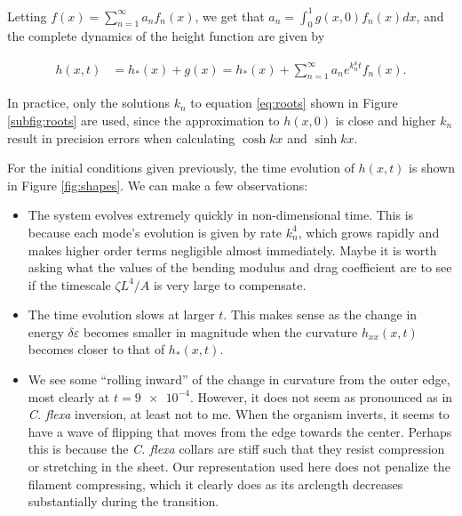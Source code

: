 \documentclass[draft]{article}
\begin{document}
Letting $f(x) = \sum_{n=1}^\infty a_n f_n(x)$, we get that $a_n = \int_0^1 g(x, 0) f_n(x)dx$, and the complete dynamics of the height function are given by 

\begin{align}
    h(x, t) &= h_*(x) + g(x) = h_*(x) + \sum_{n=1}^\infty a_n e^{k_n^4 t} f_n(x). \label{eq:sol}
\end{align}

\noindent In practice, only the solutions $k_n$ to equation \ref{eq:roots} shown in Figure \ref{subfig:roots} are used, since the approximation to $h(x, 0)$ is close and higher $k_n$ result in precision errors when calculating $\cosh kx$ and $\sinh kx$. 

For the initial conditions given previously, the time evolution of $h(x, t)$ is shown in Figure \ref{fig:shapes}. We can make a few observations:

\begin{itemize}
    \item The system evolves extremely quickly in non-dimensional time. This is because each mode's evolution is given by rate $k_n^4$, which grows rapidly and makes higher order terms negligible almost immediately. Maybe it is worth asking what the values of the bending modulus and drag coefficient are to see if the timescale $\zeta L^4 / A$ is very large to compensate.
    \item The time evolution slows at larger $t$. This makes sense as the change in energy $\delta \varepsilon$ becomes smaller in magnitude when the curvature $h_{xx}(x, t)$ becomes closer to that of $h_*(x, t)$.
    \item We see some ``rolling inward'' of the change in curvature from the outer edge, most clearly at $t = \num{9e-4}$. However, it does not seem as pronounced as in \textit{C. flexa} inversion, at least not to me. When the organism inverts, it seems to have a wave of flipping that moves from the edge towards the center. Perhaps this is because the \textit{C. flexa} collars are stiff such that they resist compression or stretching in the sheet. Our representation used here does not penalize the filament compressing, which it clearly does as its arclength decreases substantially during the transition. 
\end{itemize}
\end{document}
